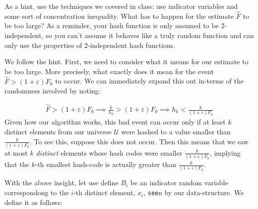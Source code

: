 \documentclass[12pt]{exam}
\newcommand*{\UU}{\mathscr{U}}   %
\newcommand*{\eps}{\varepsilon}  %
\begin{document}
\begin{questions}
\begin{parts}
As a hint, use the techniques we covered in class: use indicator variables and some sort of concentration inequality. What has to happen for the estimate $\hat{F}$ to be too large? As a reminder, your hash function is only assumed to be 2-independent, so you can't assume it behaves like a truly random function and can only use the properties of 2-independent hash functions.

\begin{solution}
We follow the hint. First, we need to consider what it means for our estimate to be too large. More precisely, what exactly does it mean for the event $\hat{F} > (1+\eps) F_0$ to occur. We can immediately expand this out in-terms of the randomness involved by noting:

\begin{align*}
  \hat{F} > (1+\eps) F_0 \implies \frac{k}{h_k} > (1+\eps) F_0  \implies h_k < \frac{k}{(1+\eps)F_0}
\end{align*}
Given how our algorithm works, this bad event can occur only if at least $k$ distinct elements from our universe $\UU$ were hashed to a value smaller than $\frac{k}{(1+ \eps)F_0}$. To see this, suppose this does not occur. Then this means that we saw at most $k$ \textit{distinct} elements whose hash codes were smaller $\frac{k}{(1+ \eps)F_0}$, implying that the $k$-th smallest hash-code is actually greater than $\frac{k}{(1+ \eps)F_0}$.

With the above insight, let use define $B_i$ be an indicator random variable correspondong to the $i$-th distinct element, $x_i$, \texttt{see}n by our data-structure. We define it as follows:


\end{solution}
\end{parts}
\end{questions}
\end{document}
